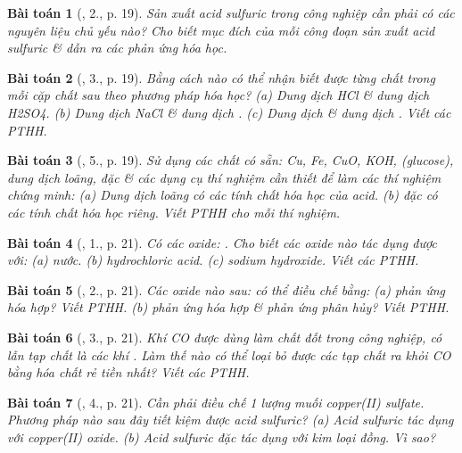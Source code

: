 \documentclass{article}
\newtheorem{baitoan}{Bài toán}
\begin{document}
\begin{baitoan}[\cite{SGK_Hoa_Hoc_9}, 2., p. 19]
	Sản xuất acid sulfuric trong công nghiệp cần phải có các nguyên liệu chủ yếu nào? Cho biết mục đích của mỗi công đoạn sản xuất acid sulfuric \& dẫn ra các phản ứng hóa học.
\end{baitoan}

\begin{baitoan}[\cite{SGK_Hoa_Hoc_9}, 3., p. 19]
	Bằng cách nào có thể nhận biết được từng chất trong mỗi cặp chất sau theo phương pháp hóa học? (a) Dung dịch \emph{HCl} \& dung dịch \emph{H2SO4}. (b) Dung dịch \emph{NaCl} \& dung dịch \emph{}. (c) Dung dịch \emph{} \& dung dịch \emph{}. Viết các PTHH.
\end{baitoan}

\begin{baitoan}[\cite{SGK_Hoa_Hoc_9}, 5., p. 19]
	Sử dụng các chất có sẵn: \emph{Cu, Fe, CuO, KOH, } (glucose), dung dịch \emph{} loãng, \emph{} đặc \& các dụng cụ thí nghiệm cần thiết để làm các thí nghiệm chứng minh: (a) Dung dịch \emph{} loãng có các tính chất hóa học của acid. (b) \emph{} đặc có các tính chất hóa học riêng. Viết PTHH cho mỗi thí nghiệm.
\end{baitoan}

\begin{baitoan}[\cite{SGK_Hoa_Hoc_9}, 1., p. 21]
	Có các oxide: \emph{}. Cho biết các oxide nào tác dụng được với: (a) nước. (b) hydrochloric acid. (c) sodium hydroxide. Viết các PTHH.
\end{baitoan}

\begin{baitoan}[\cite{SGK_Hoa_Hoc_9}, 2., p. 21]
	Các oxide nào sau: \emph{} có thể điều chế bằng: (a) phản ứng hóa hợp? Viết PTHH. (b) phản ứng hóa hợp \& phản ứng phân hủy? Viết PTHH.
\end{baitoan}

\begin{baitoan}[\cite{SGK_Hoa_Hoc_9}, 3., p. 21]
	Khí \emph{CO} được dùng làm chất đốt trong công nghiệp, có lẫn tạp chất là các khí \emph{}. Làm thế nào có thể loại bỏ được các tạp chất ra khỏi \emph{CO} bằng hóa chất rẻ tiền nhất? Viết các PTHH.
\end{baitoan}

\begin{baitoan}[\cite{SGK_Hoa_Hoc_9}, 4., p. 21]
	Cần phải điều chế 1 lượng muối copper(II) sulfate. Phương pháp nào sau đây tiết kiệm được acid sulfuric? (a) Acid sulfuric tác dụng với copper(II) oxide. (b) Acid sulfuric đặc tác dụng với kim loại đồng. Vì sao?
\end{baitoan}
\end{document}
